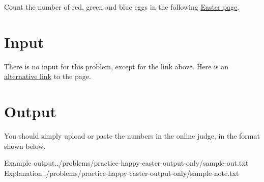 
Count the number of red, green and blue eggs in the following
\href{http://ejudge.rau.am/ejudge/easter.html}{Easter page}.

\section*{Input}
There is no input for this problem, except for the link above.
Here is an \href{http://167.71.248.201/ejudge/easter.html}{alternative link} to the page.

\section*{Output}
You should simply upload or paste the numbers in the online judge, in the format shown below.

{
\sampletable
  {Example output}{../problems/practice-happy-easter-output-only/sample-out.txt}
  {Explanation}{../problems/practice-happy-easter-output-only/sample-note.txt}
}
